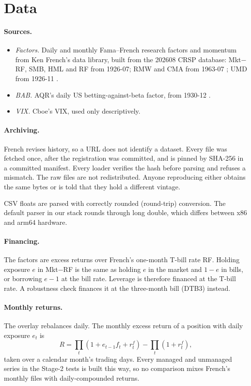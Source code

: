 \documentclass[11pt]{article}
\begin{document}
\section{Data}

\paragraph{Sources.}
\begin{itemize}
\item \emph{Factors.} Daily and monthly Fama--French research factors and
  momentum from Ken French's data library, built from the 202608 CRSP
  database: Mkt$-$RF, SMB, HML and RF from 1926-07; RMW and CMA from
  1963-07 \citep{fama2015}; UMD from 1926-11 \citep{carhart1997}.
\item \emph{BAB.} AQR's daily US betting-against-beta factor, from 1930-12
  \citep{frazzini2014}.
\item \emph{VIX.} Cboe's VIX, used only descriptively.
\end{itemize}

\paragraph{Archiving.} French revises history, so a URL does not identify a
dataset. Every file was fetched once, after the registration was committed,
and is pinned by SHA-256 in a committed manifest. Every loader verifies the
hash before parsing and refuses a mismatch. The raw files are not
redistributed. Anyone reproducing either obtains the same bytes or is told
that they hold a different vintage.

CSV floats are parsed with correctly rounded (round-trip) conversion. The
default parser in our stack rounds through long double, which differs
between x86 and arm64 hardware.

\paragraph{Financing.} The factors are excess returns over French's
one-month T-bill rate RF. Holding exposure $e$ in Mkt$-$RF is the same as
holding $e$ in the market and $1-e$ in bills, or borrowing $e-1$ at the bill
rate. Leverage is therefore financed at the T-bill rate. A robustness check
finances it at the three-month bill (DTB3) instead.

\paragraph{Monthly returns.} The overlay rebalances daily. The monthly excess
return of a position with daily exposure $e_t$ is
\[
R = \prod_t (1 + e_{t-1} f_t + r^f_t) - \prod_t (1 + r^f_t),
\]
taken over a calendar month's trading days. Every managed and unmanaged
series in the Stage-2 tests is built this way, so no comparison mixes
French's monthly files with daily-compounded returns.
\end{document}
